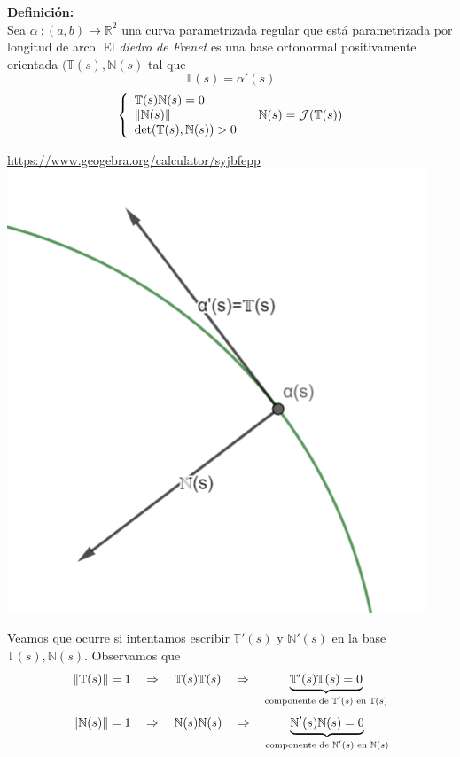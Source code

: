 \documentclass{article}
\begin{document}
\textbf{Definición:}\\
Sea $\alpha\::(a,b)\longrightarrow\mathbb{R}^2$ una curva parametrizada regular que está parametrizada por longitud de arco. El \textit{diedro de Frenet} es una base ortonormal positivamente orientada $(\mathbb{T}(s),\mathbb{N}(s)$ tal que
$$
\mathbb{T}(s)=\alpha'(s)
$$
$$
\left\{\begin{array}{l}
    \mathbb{T}(s)\mathbb{N}(s)=0\\
    \left\|\mathbb{N}(s)\right\|\\
    \det(\mathbb{T}(s),\mathbb{N}(s))>0
\end{array}\right.\quad
\mathbb{N}(s)=\mathcal{J}(\mathbb{T}(s))
$$
\begin{center}
    \url{https://www.geogebra.org/calculator/syjbfepp}\\
    \includegraphics[scale=0.5]{figuras/Diedro de frenet.PNG}
\end{center}
Veamos que ocurre si intentamos escribir $\mathbb{T}'(s)$ y $\mathbb{N}'(s)$ en la base $\mathbb{T}(s),\mathbb{N}(s)$. Observamos que
$$
\left\|\mathbb{T}(s)\right\|=1\quad\Rightarrow\quad\mathbb{T}(s)\mathbb{T}(s)\quad\Rightarrow\quad\underbrace{\mathbb{T}'(s)\mathbb{T}(s)=0}_{\text{componente de $\mathbb{T}'(s)$ en $\mathbb{T}(s)$}}
$$
$$
\left\|\mathbb{N}(s)\right\|=1\quad\Rightarrow\quad\mathbb{N}(s)\mathbb{N}(s)\quad\Rightarrow\quad\underbrace{\mathbb{N}'(s)\mathbb{N}(s)=0}_{\text{componente de $\mathbb{N}'(s)$ en $\mathbb{N}(s)$}}
$$
\end{document}
